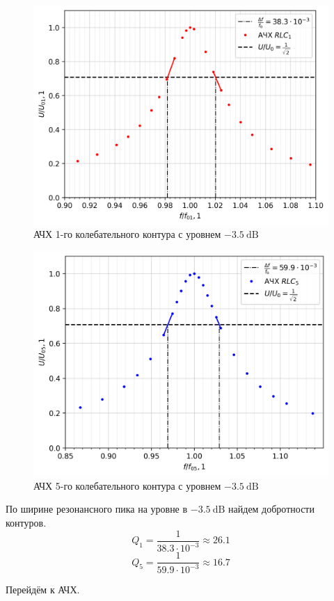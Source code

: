 \documentclass[12pt, a4paper]{article}
\begin{document}
\begin{figure}[H]
  \includegraphics[width=0.8\linewidth]{afc1.png}
  \caption{АЧХ 1-го колебательного контура с уровнем $-3.5~\mathrm{dB}$}
\end{figure}

\begin{figure}[H]
  \includegraphics[width=0.8\linewidth]{afc5.png}
  \caption{АЧХ 5-го колебательного контура с уровнем $-3.5~\mathrm{dB}$}
\end{figure}

\newpage
По ширине резонансного пика на уровне в $-3.5~\mathrm{dB}$ найдем добротности контуров.
$$Q_1 = \dfrac{1}{38.3\cdot 10^{-3}} \approx 26.1$$
$$Q_5 = \dfrac{1}{59.9\cdot 10^{-3}} \approx 16.7$$

Перейдём к АЧХ.
\end{document}
